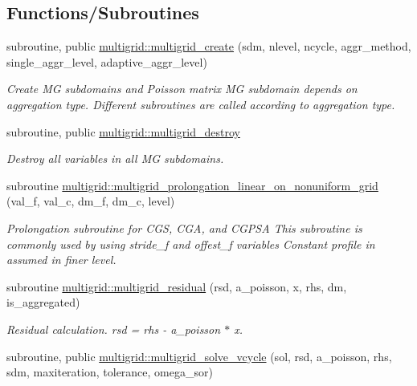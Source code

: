 \subsection*{Functions/\+Subroutines}
\begin{DoxyCompactItemize}
\item 
subroutine, public \hyperlink{namespacemultigrid_ac8deb32ba5698e37f75c369dc063b277}{multigrid\+::multigrid\+\_\+create} (sdm, nlevel, ncycle, aggr\+\_\+method, single\+\_\+aggr\+\_\+level, adaptive\+\_\+aggr\+\_\+level)
\begin{DoxyCompactList}\small\item\em Create MG subdomains and Poisson matrix  MG subdomain depends on aggregation type. Different subroutines are called according to aggregation type. \end{DoxyCompactList}\item 
\mbox{\label{namespacemultigrid_a07ed47be36b2e0df9d71ec58151b642b}} 
subroutine, public \hyperlink{namespacemultigrid_a07ed47be36b2e0df9d71ec58151b642b}{multigrid\+::multigrid\+\_\+destroy}
\begin{DoxyCompactList}\small\item\em Destroy all variables in all MG subdomains. \end{DoxyCompactList}\item 
subroutine \hyperlink{namespacemultigrid_a839d1e13e2d0bac4959deec5669d4171}{multigrid\+::multigrid\+\_\+prolongation\+\_\+linear\+\_\+on\+\_\+nonuniform\+\_\+grid} (val\+\_\+f, val\+\_\+c, dm\+\_\+f, dm\+\_\+c, level)
\begin{DoxyCompactList}\small\item\em Prolongation subroutine for C\+GS, C\+GA, and C\+G\+P\+SA  This subroutine is commonly used by using stride\+\_\+f and offest\+\_\+f variables Constant profile in assumed in finer level. \end{DoxyCompactList}\item 
subroutine \hyperlink{namespacemultigrid_ad1ba34848f786afdf0e91afb3d3be819}{multigrid\+::multigrid\+\_\+residual} (rsd, a\+\_\+poisson, x, rhs, dm, is\+\_\+aggregated)
\begin{DoxyCompactList}\small\item\em Residual calculation. rsd = rhs -\/ a\+\_\+poisson $\ast$ x. \end{DoxyCompactList}\item 
subroutine, public \hyperlink{namespacemultigrid_a7d60c9d01777350a79ff7bd975a90121}{multigrid\+::multigrid\+\_\+solve\+\_\+vcycle} (sol, rsd, a\+\_\+poisson, rhs, sdm, maxiteration, tolerance, omega\+\_\+sor)

\end{DoxyCompactItemize}
